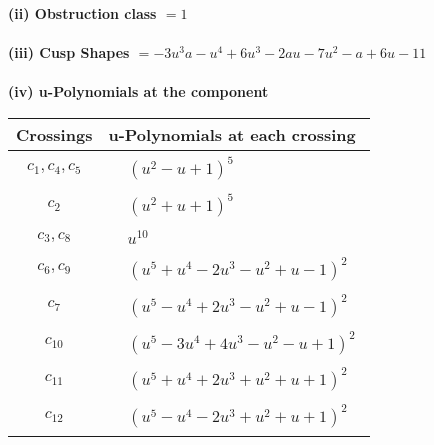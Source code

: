 \documentclass[1p]{elsarticle_modified}
\theoremstyle{definition}
\begin{document}
\flushleft \textbf{(ii) Obstruction class $= 1$}\\~\\
\flushleft \textbf{(iii) Cusp Shapes $= -3 u^3 a- u^4+6 u^3-2 a u-7 u^2- a+6 u-11$}\\~\\
\newpage\renewcommand{\arraystretch}{1}
\flushleft \textbf{(iv) u-Polynomials at the component}\newline \\
\begin{tabular}{m{50pt}|m{274pt}}
Crossings & \hspace{64pt}u-Polynomials at each crossing \\
\hline $$\begin{aligned}c_{1},c_{4},c_{5}\end{aligned}$$&$\begin{aligned}
&(u^2- u+1)^5
\end{aligned}$\\
\hline $$\begin{aligned}c_{2}\end{aligned}$$&$\begin{aligned}
&(u^2+u+1)^5
\end{aligned}$\\
\hline $$\begin{aligned}c_{3},c_{8}\end{aligned}$$&$\begin{aligned}
&u^{10}
\end{aligned}$\\
\hline $$\begin{aligned}c_{6},c_{9}\end{aligned}$$&$\begin{aligned}
&(u^5+u^4-2 u^3- u^2+u-1)^2
\end{aligned}$\\
\hline $$\begin{aligned}c_{7}\end{aligned}$$&$\begin{aligned}
&(u^5- u^4+2 u^3- u^2+u-1)^2
\end{aligned}$\\
\hline $$\begin{aligned}c_{10}\end{aligned}$$&$\begin{aligned}
&(u^5-3 u^4+4 u^3- u^2- u+1)^2
\end{aligned}$\\
\hline $$\begin{aligned}c_{11}\end{aligned}$$&$\begin{aligned}
&(u^5+u^4+2 u^3+u^2+u+1)^2
\end{aligned}$\\
\hline $$\begin{aligned}c_{12}\end{aligned}$$&$\begin{aligned}
&(u^5- u^4-2 u^3+u^2+u+1)^2
\end{aligned}$\\
\hline
\end{tabular}\\~\\
\end{document}
